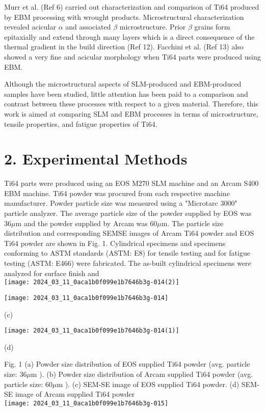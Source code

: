 \documentclass[10pt]{article}
\begin{document}
Murr et al. (Ref 6) carried out characterization and comparison of Ti64 produced by EBM processing with wrought products. Microstructural characterization revealed acicular $\alpha$ and associated $\beta$ microstructure. Prior $\beta$ grains form epitaxially and extend through many layers which is a direct consequence of the thermal gradient in the build direction (Ref 12). Facchini et al. (Ref 13) also showed a very fine and acicular morphology when Ti64 parts were produced using EBM.

Although the microstructural aspects of SLM-produced and EBM-produced samples have been studied, little attention has been paid to a comparison and contrast between these processes with respect to a given material. Therefore, this work is aimed at comparing SLM and EBM processes in terms of microstructure, tensile properties, and fatigue properties of Ti64.

\section*{2. Experimental Methods}
Ti64 parts were produced using an EOS M270 SLM machine and an Arcam S400 EBM machine. Ti64 powder was procured from each respective machine manufacturer. Powder particle size was measured using a "Microtarc 3000" particle analyzer. The average particle size of the powder supplied by EOS was $36 \mu \mathrm{m}$ and the powder supplied by Arcam was $60 \mu \mathrm{m}$. The particle size distribution and corresponding SEMSE images of Arcam Ti64 powder and EOS Ti64 powder are shown in Fig. 1. Cylindrical specimens and specimens conforming to ASTM standards (ASTM: E8) for tensile testing and for fatigue testing (ASTM: E466) were fabricated. The as-built cylindrical specimens were analyzed for surface finish and\\
\texttt{[image: 2024\_03\_11\_0aca1b0f099e1b7646b3g-014(2)]}

\begin{center}
\texttt{[image: 2024\_03\_11\_0aca1b0f099e1b7646b3g-014]}
\end{center}

(c)

\begin{center}
\texttt{[image: 2024\_03\_11\_0aca1b0f099e1b7646b3g-014(1)]}
\end{center}

(d)

Fig. 1 (a) Powder size distribution of EOS supplied Ti64 powder (avg. particle size: $36 \mu \mathrm{m}$ ). (b) Powder size distribution of Arcam supplied Ti64 powder (avg. particle size: $60 \mu \mathrm{m}$ ). (c) SEM-SE image of EOS supplied Ti64 powder. (d) SEM-SE image of Arcam supplied Ti64 powder\\
\texttt{[image: 2024\_03\_11\_0aca1b0f099e1b7646b3g-015]}
\end{document}
